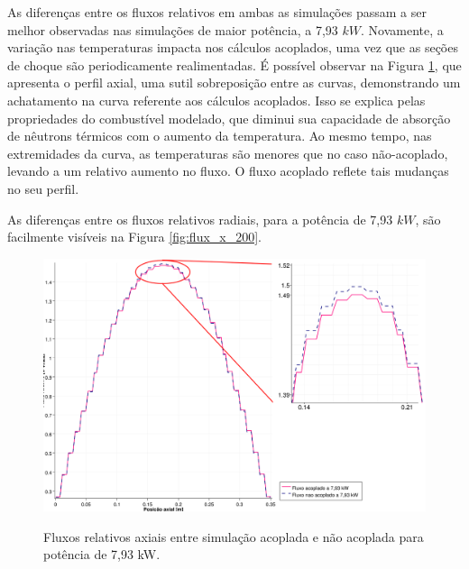 As diferenças entre os fluxos relativos em ambas as simulações passam a ser melhor
observadas nas simulações de maior potência, a 7,93 $kW$. Novamente, a variação nas temperaturas
impacta nos cálculos acoplados, uma vez que as seções de choque são periodicamente
realimentadas. É possível observar na Figura \ref{fig:flux_z_200}, que apresenta o perfil axial,
uma sutil sobreposição entre as curvas, demonstrando um achatamento na curva
referente aos cálculos acoplados. Isso se explica pelas propriedades do combustível modelado,
que diminui sua capacidade de absorção de nêutrons térmicos com o aumento da temperatura.
Ao mesmo tempo, nas extremidades da curva, as temperaturas são menores que no caso não-acoplado,
levando a um relativo aumento no fluxo. O fluxo acoplado reflete tais mudanças no seu perfil.

As diferenças entre os fluxos relativos radiais, para a potência de 7,93 $kW$, são facilmente
visíveis na Figura \ref{fig:flux_x_200}.

\begin{figure}[htb]
  \caption{Fluxos relativos axiais entre simulação acoplada e não acoplada para
    potência de 7,93 kW.}
  \centering\includegraphics[scale=0.5]{figuras/Flux_rel_z_200_port_trabalhado.png}
  \label{fig:flux_z_200}
\end{figure}

